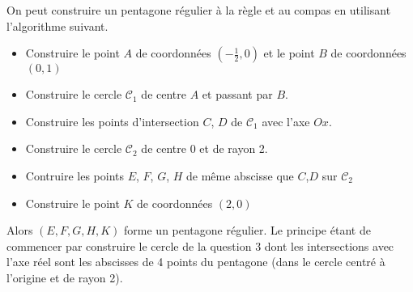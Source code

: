 \begin{enumerate}
On peut construire un pentagone régulier à la règle et au compas en utilisant l'algorithme suivant.
\begin{itemize}
 \item Construire le point $A$ de coordonnées $(-\frac{1}{2},0)$ et le point $B$ de coordonnées $(0,1)$
 \item Construire le cercle $\mathcal C_1$ de centre $A$ et passant par $B$.
 \item Construire les points d'intersection $C$, $D$ de $\mathcal C_1$ avec l'axe $Ox$.
 \item Construire le cercle $\mathcal C_2$ de centre $0$ et de rayon 2.
 \item Contruire les points $E$, $F$, $G$, $H$ de même abscisse que $C$,$D$ sur $\mathcal C_2$
 \item Construire le point $K$ de coordonnées $(2,0)$ 
\end{itemize}
Alors $(E,F,G,H,K)$ forme un pentagone régulier.\newline
Le principe étant de commencer par construire le cercle de la question 3 dont les intersections avec l'axe réel sont les abscisses de 4 points du pentagone (dans le cercle centré à l'origine et de rayon 2).
\end{enumerate}

